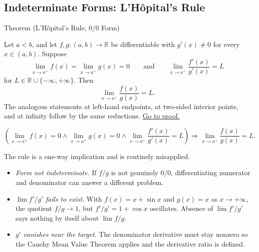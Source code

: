 \subsection{Indeterminate Forms: L'H\^{o}pital's Rule}
\label{sec:lhopital}

\begin{theorembox}{Theorem (L'H\^{o}pital's Rule, \(0/0\) Form)}
\begin{theorem}
\label{thm:lhopital-zero-over-zero}
Let \(a<b\), and let \(f,g:(a,b)\to\mathbb{R}\) be differentiable with \(g'(x)\neq 0\) for every \(x\in(a,b)\). Suppose
\[
  \lim_{x\to a^+}f(x)=\lim_{x\to a^+}g(x)=0
  \qquad\text{and}\qquad
  \lim_{x\to a^+}\frac{f'(x)}{g'(x)}=L
\]
for \(L\in\mathbb{R}\cup\{-\infty,+\infty\}\). Then
\[
  \lim_{x\to a^+}\frac{f(x)}{g(x)}=L.
\]
The analogous statements at left-hand endpoints, at two-sided interior points, and at infinity follow by the same reductions.
\hyperref[prf:lhopital-zero-over-zero]{Go to proof.}
\end{theorem}
\end{theorembox}

\begin{remark*}
\[
  \left(
  \lim_{x\to a^+}f(x)=0
  \land
  \lim_{x\to a^+}g(x)=0
  \land
  \lim_{x\to a^+}\frac{f'(x)}{g'(x)}=L
  \right)
  \Longrightarrow
  \lim_{x\to a^+}\frac{f(x)}{g(x)}=L.
\]
\end{remark*}

\begin{remark*}
The rule is a one-way implication and is routinely misapplied.
\begin{itemize}
  \item \emph{Form not indeterminate.} If \(f/g\) is not genuinely \(0/0\),
        differentiating numerator and denominator can answer a different
        problem.
  \item \emph{\(\lim f'/g'\) fails to exist.} With \(f(x)=x+\sin x\) and
        \(g(x)=x\) as \(x\to+\infty\), the quotient \(f/g\to1\), but
        \(f'/g'=1+\cos x\) oscillates. Absence of \(\lim f'/g'\) says
        nothing by itself about \(\lim f/g\).
  \item \emph{\(g'\) vanishes near the target.} The denominator derivative
        must stay nonzero so the Cauchy Mean Value Theorem applies and the
        derivative ratio is defined.
\end{itemize}
\end{remark*}

